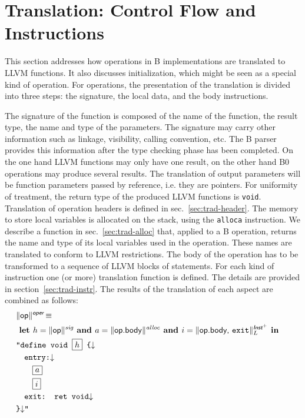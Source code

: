 \documentclass{llncs}
\newcommand{\trad}[2]{\ensuremath{\lVert \textsf{#1} \rVert^{\textit{#2}}}}
\newcommand{\nl}[0]{\ensuremath{\downarrow}}
\DeclareMathOperator{\isdef}{\equiv}
\newcommand{\llvm}[1]{\texttt{#1}}
\newcommand{\B}[1]{\textsf{#1}}
\newcommand{\ListOf}[1]{$\mbox{#1}^+$}
\newcommand{\LET}[0]{\textbf{ let }}
\newcommand{\IN}[0]{\textbf{ in }}
\newcommand{\AND}[0]{\textbf{ and }}
\newcommand{\PH}[1]{\framebox{$#1$}}
\begin{document}
\section{Translation: Control Flow and Instructions
\label{sec:control}}

This section addresses how operations in B implementations are translated to
LLVM functions. It also discusses initialization, which might be seen as a
special kind of operation. For operations, the presentation of the translation
is divided into three steps: the signature, the local data, and the body
instructions.

The signature of the function is composed of the name of the function, the
result type, the name and type of the parameters. The signature may carry other
information such as linkage, visibility, calling convention, etc. The B parser
provides this information after the type checking phase has been completed.  On
the one hand LLVM functions may only have one result, on the other hand B0
operations may produce several results. The translation of output parameters
will be function parameters passed by reference, i.e. they are pointers. For
uniformity of treatment, the return type of the produced LLVM functions is
\llvm{void}. Translation of operation headers is defined in
sec.~\ref{sec:trad-header}. The memory to store local variables is allocated on
the stack, using the \llvm{alloca} instruction. We describe a function in
sec.~\ref{sec:trad-alloc} that, applied to a B operation, returns the name and
type of its local variables used in the operation. These names are translated to
conform to LLVM restrictions. The body of the operation has to be transformed to
a sequence of LLVM blocks of statements. For each kind of instruction one (or
more) translation function is defined. The details are provided in
section~\ref{sec:trad-instr}.  The results of the translation of each aspect are
combined as follows:
\begin{align*}
\begin{split}
  \lefteqn{\trad{\B{op}}{\B{oper}} \isdef} \\
  & \LET h = \trad{\B{op}}{sig} \AND   a = \trad{\B{op.body}}{alloc} \AND i = \trad{\B{op.body}, \llvm{exit}}{\ListOf{\B{Inst}}}_L \IN  \\
  & \llvm{"define void \PH{h} \{\nl} \\
  & \quad \llvm{entry:\nl} \\
  & \quad \quad \PH{a} \\
  & \quad \quad \PH{i} \\
  & \quad \llvm{exit: ret void\nl} \\
  & \llvm{\}\nl"}
\end{split}
\end{align*}
\end{document}

